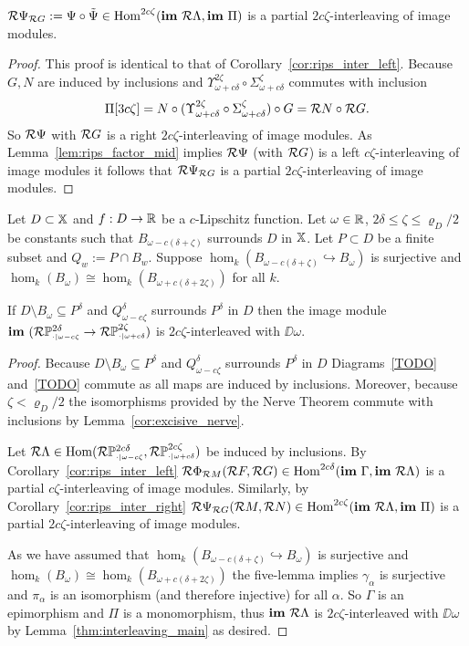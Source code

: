 \begin{corollary}\label{cor:rips_inter_right}
  $\mathcal{R} \Psi_{\mathcal{R} G} := \Psi\circ\tilde{\Psi}\in\mathrm{Hom}^{2c\zeta}(\mathbf{im}~\mathcal{R}\Lambda, \mathbf{im}~\Pi)$ is a partial $2c\zeta$-interleaving of image modules.
\end{corollary}
\begin{proof}
  This proof is identical to that of Corollary~\ref{cor:rips_inter_left}.
  Because $G,N$ are induced by inclusions and $\Upsilon_{\omega+c\delta}^{2\zeta}\circ \Sigma_{\omega+c\delta}^{\zeta}$ commutes with inclusion
  \[\Pi[3c\zeta] = N\circ (\Upsilon_{\omega+c\delta}^{2\zeta}\circ \Sigma_{\omega+c\delta}^{\zeta})\circ G = \mathcal{R} N\circ \mathcal{R} G.\]
  So $\mathcal{R}\Psi$ with $\mathcal{R} G$ is a right $2c\zeta$-interleaving of image modules.
  As Lemma~\ref{lem:rips_factor_mid} implies $\mathcal{R} \Psi$ (with $\mathcal{R} G$) is a left $c\zeta$-interleaving of image modules it follows that $\mathcal{R} \Psi_{\mathcal{R} G}$ is a partial $2c\zeta$-interleaving of image modules.
\end{proof}

\begin{theorem}
  Let $D\subset\mathbb{X}$ and $f : D\to\mathbb{R}$ be a $c$-Lipschitz function.
  Let $\omega\in\mathbb{R}$, $2\delta\leq\zeta\leq\varrho_D/2$ be constants such that $B_{\omega-c(\delta+\zeta)}$ surrounds $D$ in $\mathbb{X}$.
  Let $P\subset D$ be a finite subset and $Q_w := P\cap B_w$.
  Suppose $\hom_k(B_{\omega-c(\delta+\zeta)}\hookrightarrow B_\omega)$ is surjective and $\hom_k(B_\omega)\cong\hom_k(B_{\omega+c(\delta+2\zeta)})$ for all $k$.

  If $D\setminus B_\omega\subseteq P^\delta$ and $Q_{\omega-c\zeta}^\delta$ surrounds $P^\delta$ in $D$ then the image module $\mathbf{im}~(\mathcal{R}\mathbb{P}_{\scriptscriptstyle \cdot\mid \omega-c\zeta}^{2\delta}\to \mathcal{R}\mathbb{P}_{\scriptscriptstyle \cdot\mid \omega+c\delta}^{2\zeta})$ is $2c\zeta$-interleaved with $\DD{\omega}$.
\end{theorem}
\begin{proof}
  Because $D\setminus B_\omega\subseteq P^\delta$ and $Q_{\omega-c\zeta}^\delta$ surrounds $P^\delta$ in $D$ Diagrams~\ref{TODO} and~\ref{TODO} commute as all maps are induced by inclusions.
  Moreover, because $\zeta < \varrho_D/2$ the isomorphisms provided by the Nerve Theorem commute with inclusions by Lemma~\ref{cor:excisive_nerve}.

  Let $\mathcal{R}\Lambda \in\mathrm{Hom}(\mathcal{R}\mathbb{P}_{\scriptscriptstyle \cdot\mid \omega-c\zeta}^{2c\delta}, \mathcal{R}\mathbb{P}_{\scriptscriptstyle \cdot\mid \omega+c\delta}^{2c\zeta})$ be induced by inclusions.
  By Corollary~\ref{cor:rips_inter_left} $\mathcal{R} \Phi_{\mathcal{R} M}(\mathcal{R} F, \mathcal{R} G)\in\mathrm{Hom}^{2c\delta}(\mathbf{im}~\Gamma,\mathbf{im}~\mathcal{R}\Lambda)$ is a partial $c\zeta$-interleaving of image modules.
  Similarly, by Corollary~\ref{cor:rips_inter_right} $\mathcal{R} \Psi_{\mathcal{R} G} (\mathcal{R} M,\mathcal{R} N)\in\mathrm{Hom}^{2c\zeta}(\mathbf{im}~\mathcal{R}\Lambda, \mathbf{im}~\Pi)$ is a partial $2c\zeta$-interleaving of image modules.

  As we have assumed that $\hom_k(B_{\omega-c(\delta+\zeta)}\hookrightarrow B_\omega)$ is surjective and $\hom_k(B_\omega)\cong\hom_k(B_{\omega+c(\delta+2\zeta)})$ the five-lemma implies $\gamma_\alpha$ is surjective and $\pi_\alpha$ is an isomorphism (and therefore injective) for all $\alpha$.
  So $\Gamma$ is an epimorphism and $\Pi$ is a monomorphism, thus $\mathbf{im}~\mathcal{R}\Lambda$ is $2c\zeta$-interleaved with $\DD{\omega}$ by Lemma~\ref{thm:interleaving_main} as desired.
\end{proof}
